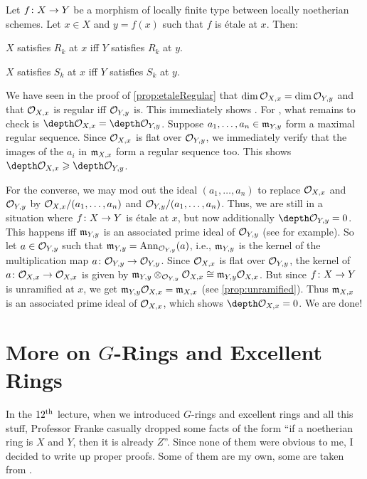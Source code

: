 \begin{lem*}\label{lem:EtaleRkSk}
	Let $f\colon X\morphism Y$ be a morphism of locally finite type between locally noetherian schemes. Let $x\in X$ and $y=f(x)$ such that $f$ is étale at $x$. Then:
	\begin{alphanumerate}
		\item $X$ satisfies $R_k$ at $x$ iff $Y$ satisfies $R_k$ at $y$.
		\item $X$ satisfies $S_k$ at $x$ iff $Y$ satisfies $S_k$ at $y$.
	\end{alphanumerate}
\end{lem*}
\begin{proof*}
	We have seen in the proof of \cref{prop:etaleRegular} that $\dim \mathcal{O}_{X,x}=\dim\mathcal{O}_{Y,y}$ and that $\mathcal{O}_{X,x}$ is regular iff $\mathcal{O}_{Y,y}$ is. This immediately shows . For , what remains to check is $\depth \Oo_{X,x}=\depth\Oo_{Y,y}$. Suppose $a_1,\dotsc,a_n\in\mathfrak{m}_{Y,y}$ form a maximal regular sequence. Since $\mathcal{O}_{X,x}$ is flat over $\mathcal{O}_{Y,y}$, we immediately verify that the images of the $a_i$ in $\mathfrak{m}_{X,x}$ form a regular sequence too. This shows $\depth\Oo_{X,x}\geq \depth\Oo_{Y,y}$.
	
	For the converse, we may mod out the ideal $(a_1,\dotsc,a_n)$ to replace $\mathcal{O}_{X,x}$ and $\mathcal{O}_{Y,y}$ by $\mathcal{O}_{X,x}/(a_1,\dotsc,a_n)$ and $\mathcal{O}_{Y,y}/(a_1,\dotsc,a_n)$. Thus, we are still in a situation where $f\colon X\morphism Y$ is étale at $x$, but now additionally $\depth \Oo_{Y,y}=0$. This happens iff $\mathfrak{m}_{Y,y}$ is an associated prime ideal of $\mathcal{O}_{Y,y}$ (see \cite[Lemma~2.3.1]{homalg} for example). So let $a\in\mathcal{O}_{Y,y}$ such that $\mathfrak{m}_{Y,y}=\operatorname{Ann}_{\mathcal{O}_{Y,y}}(a)$, i.e., $\mathfrak{m}_{Y,y}$ is the kernel of the multiplication map $a\colon \Oo_{Y,y}\morphism\Oo_{Y,y}$. Since $\mathcal{O}_{X,x}$ is flat over $\mathcal{O}_{Y,y}$, the kernel of $a\colon \Oo_{X,x}\morphism\Oo_{X,x}$ is given by $\mathfrak{m}_{Y,y}\otimes_{\mathcal{O}_{Y,y}}\mathcal{O}_{X,x}\cong \mathfrak{m}_{Y,y}\mathcal{O}_{X,x}$. But since $f\colon X\morphism Y$ is unramified at $x$, we get $\mathfrak{m}_{Y,y}\mathcal{O}_{X,x}=\mathfrak{m}_{X,x}$ (see \cref{prop:unramified}). Thus $\mathfrak{m}_{X,x}$ is an associated prime ideal of $\mathcal{O}_{X,x}$, which shows $\depth \Oo_{X,x}=0$. We are done!
\end{proof*}
\section{More on \texorpdfstring{$G$}{G}-Rings and Excellent Rings}
In the $12^{\text{th}}$ lecture, when we introduced $G$-rings and excellent rings and all this stuff, Professor Franke casually dropped some facts of the form \enquote{if a noetherian ring is $X$ and $Y$, then it is already $Z$}. Since none of them were obvious to me, I decided to write up proper proofs. Some of them are my own, some are taken from \cite{stacks-project}.

